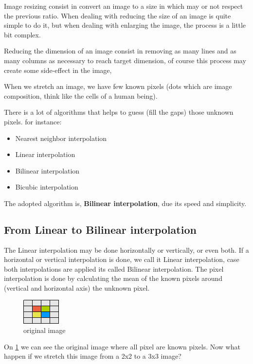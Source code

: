 \documentclass{article}
\begin{document}
	Image resizing consist in convert an image to a size in which may or not respect the previous ratio.
	When dealing with reducing the size of an image is quite simple to do it, but when dealing with enlarging 
	the image, the process is a little bit complex.

	Reducing the dimension of an image consist in removing as many lines and as many columns as necessary to reach target dimension, of course this
	process may create some side-effect in the image, 

	When we stretch an image, we have few known pixels (dots which are image composition, think like the cells of a human being).

	There is a lot of algorithms that helps to guess (fill the gaps) those unknown pixels. for instance:

	\begin{itemize}
	  \item Nearest neighbor interpolation
	  \item Linear interpolation
	  \item Bilinear interpolation
	  \item Bicubic interpolation
	\end{itemize}

	The adopted algorithm is, \textbf{Bilinear interpolation},  due its speed and simplicity.
	
\subsection{From Linear to Bilinear interpolation}

	The Linear interpolation may be done horizontally or vertically, or even both. If a horizontal or vertical interpolation is done, we call it
	Linear interpolation, case both interpolations are applied its called Bilinear interpolation.	
	The pixel interpolation is done by calculating the mean of the known pixels around (vertical and horizontal axis) the unknown pixel. 

	\begin{figure} [H]
		\centering
		\includegraphics[scale=1]{images/bilinear_interpolation_1}
		\caption{original image \label{bilinear1}}
	\end{figure}

	On \ref{bilinear1} we can see the original image where all pixel are known pixels. Now what happen if we stretch this image 
	from a 2x2 to a 3x3 image?
	
\end{document}
